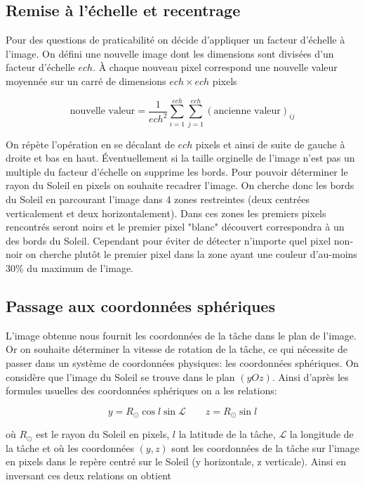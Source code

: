 \documentclass[a4paper,11pt]{article}
\numberwithin{equation}{section}
\begin{document}
\subsection{Remise à l'échelle et recentrage}
Pour des questions de praticabilité on décide d'appliquer un facteur d'échelle à l'image. On défini une nouvelle image dont les dimensions sont divisées d'un facteur d'échelle $ech$. À chaque nouveau pixel correspond une nouvelle valeur moyennée sur un carré de dimensions $ech\times ech$ pixels

\begin{equation}
  \text{nouvelle valeur} = \frac{1}{ech^2} \sum_{i=1}^{ech} \sum_{j=1}^{ech} (\text{ancienne valeur})_{ij}
\end{equation}

On répète l'opération en se décalant de $ech$ pixels et ainsi de suite de gauche à droite et bas en haut. Éventuellement si la taille orginelle de l'image n'est pas un multiple du facteur d'échelle on supprime les bords.\newline
Pour pouvoir déterminer le rayon du Soleil en pixels on souhaite recadrer l'image. On cherche donc les bords du Soleil en parcourant l'image dans 4 zones restreintes (deux centrées verticalement et deux horizontalement). Dans ces zones les premiers pixels rencontrés seront noirs et le premier pixel "blanc" découvert correspondra à un des bords du Soleil. Cependant pour éviter de détecter n'importe quel pixel non-noir on cherche plutôt le premier pixel dans la zone ayant une couleur d'au-moins 30\% du maximum de l'image.

\subsection{Passage aux coordonnées sphériques}
L'image obtenue nous fournit les coordonnées de la tâche dans le plan de l'image. Or on souhaite déterminer la vitesse de rotation de la tâche, ce qui nécessite de passer dans un système de coordonnées physiques: les coordonnées sphériques.\newline
On considère que l'image du Soleil se trouve dans le plan $(yOz)$. Ainsi d'après les formules usuelles des coordonnées sphériques on a les relations:

\begin{equation}
  y = R_{\odot} \cos l \sin \mathscr{L} \qquad  z = R_{\odot} \sin l
\end{equation}

où $R_{\odot}$ est le rayon du Soleil en pixels, $l$ la latitude de la tâche, $\mathscr{L}$ la longitude de la tâche et où les coordonnées $(y,z)$ sont les coordonnées de la tâche sur l'image en pixels dans le repère centré sur le Soleil (y horizontale, z verticale).\newline
Ainsi en inversant ces deux relations on obtient
\end{document}
